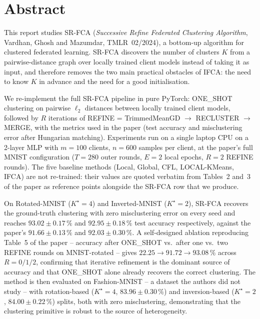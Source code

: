\thispagestyle{plain}

\chapter*{Abstract}

This report studies SR-FCA (\textit{Successive Refine Federated Clustering Algorithm}, Vardhan, Ghosh and Mazumdar, TMLR~02/2024), a bottom-up algorithm for clustered federated learning. SR-FCA discovers the number of clusters $K$ from a pairwise-distance graph over locally trained client models instead of taking it as input, and therefore removes the two main practical obstacles of IFCA: the need to know $K$ in advance and the need for a good initialisation.

We re-implement the full SR-FCA pipeline in pure PyTorch: ONE\_SHOT clustering on pairwise $\ell_2$ distances between locally trained client models, followed by $R$ iterations of REFINE = TrimmedMeanGD $\to$ RECLUSTER $\to$ MERGE, with the metrics used in the paper (test accuracy and misclustering error after Hungarian matching). Experiments run on a single laptop CPU on a 2-layer MLP with $m = 100$ clients, $n = 600$ samples per client, at the paper's full MNIST configuration ($T = 280$ outer rounds, $E = 2$ local epochs, $R = 2$ REFINE rounds). The five baseline methods (Local, Global, CFL, LOCAL-KMeans, IFCA) are not re-trained: their values are quoted verbatim from Tables~2 and~3 of the paper as reference points alongside the SR-FCA row that we produce.

On Rotated-MNIST ($K^\star = 4$) and Inverted-MNIST ($K^\star = 2$), SR-FCA recovers the ground-truth clustering with zero misclustering error on every seed and reaches $93.02 \pm 0.17\,\%$ and $92.95 \pm 0.18\,\%$ test accuracy respectively, against the paper's $91.66 \pm 0.13\,\%$ and $92.03 \pm 0.30\,\%$. A self-designed ablation reproducing Table~5 of the paper -- accuracy after ONE\_SHOT vs.\ after one vs.\ two REFINE rounds on MNIST-rotated -- gives $22.25 \to 91.72 \to 93.08\,\%$ across $R = 0/1/2$, confirming that iterative refinement is the dominant source of accuracy and that ONE\_SHOT alone already recovers the correct clustering. The method is then evaluated on Fashion-MNIST -- a dataset the authors did not study -- with rotation-based ($K^\star = 4$, $83.96 \pm 0.30\,\%$) and inversion-based ($K^\star = 2$, $84.00 \pm 0.22\,\%$) splits, both with zero misclustering, demonstrating that the clustering primitive is robust to the source of heterogeneity.

\MediaOptionLogicBlank
